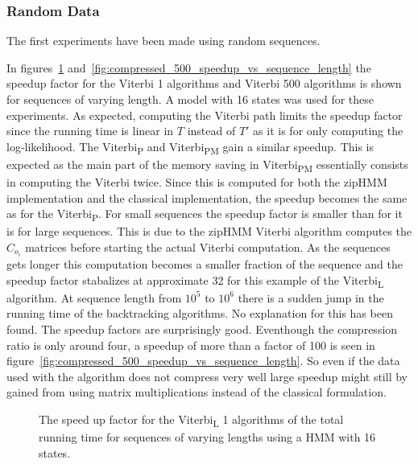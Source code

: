 \subsubsection{Random Data}

The first experiments have been made using random sequences.

In figures~\ref{fig:compressed_1_speedup_vs_sequence_length}
and~\ref{fig:compressed_500_speedup_vs_sequence_length} the speedup factor for
the Viterbi 1 algorithms and Viterbi 500 algorithms is shown for sequences of
varying length. A model with 16 states was used for these experiments. As
expected, computing the Viterbi path limits the speedup factor since the
running time is linear in $T$ instead of $T'$ as it is for only computing the
log-likelihood. The Viterbi\textsubscript{P} and Viterbi\textsubscript{PM} gain
a similar speedup. This is expected as the main part of the memory saving in
Viterbi\textsubscript{PM} essentially consists in computing the Viterbi twice.
Since this is computed for both the zipHMM implementation and the classical
implementation, the speedup becomes the same as for the
Viterbi\textsubscript{P}. For small sequences the speedup factor is smaller
than for it is for large sequences. This is due to the zipHMM Viterbi
algorithm computes the $C_{o_i}$ matrices before starting the actual Viterbi
computation. As the sequences gets longer this computation becomes a smaller
fraction of the sequence and the speedup factor stabalizes at approximate 32
for this example of the Viterbi\textsubscript{L} algorithm. At sequence length
from $10^5$ to $10^6$ there is a sudden jump in the running time of the
backtracking algorithms. No explanation for this has been found.  The speedup factors are surprisingly good. Eventhough the
compression ratio is only around four, a speedup of more than a factor of 100
is seen in figure~\ref{fig:compressed_500_speedup_vs_sequence_length}. So even
if the data used with the algorithm does not compress very well large speedup
might still by gained from using matrix multiplications instead of the classical
formulation. 

\begin{figure}
  \centering
  
  \caption{The speed up factor for the Viterbi\textsubscript{L} 1 algorithms of the total
    running time for sequences of varying lengths using
    a HMM with 16 states.}
  \label{fig:compressed_1_speedup_vs_sequence_length}
\end{figure}

